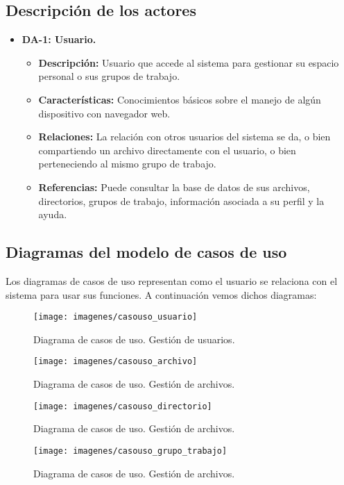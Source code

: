 \subsection{Descripción de los actores}
\begin{itemize}
	\item \textbf{DA-1: Usuario.}
	\begin{itemize}
		\item \textbf{Descripción:} Usuario que accede al sistema para gestionar su espacio personal o sus grupos de trabajo.
		\item \textbf{Características:} Conocimientos básicos sobre el manejo de algún dispositivo con navegador web.
		\item \textbf{Relaciones:} La relación con otros usuarios del sistema se da, o bien compartiendo un archivo directamente con el usuario, o bien perteneciendo al mismo grupo de trabajo.
		\item \textbf{Referencias:} Puede consultar la base de datos de sus archivos, directorios, grupos de trabajo, información asociada a su perfil y la ayuda.
	\end{itemize}
\end{itemize}
\subsection{Diagramas del modelo de casos de uso}
Los diagramas de casos de uso representan como el usuario se relaciona con el sistema para usar sus funciones. A continuación vemos dichos diagramas:

\begin{figure}[H]
	\centering
	\texttt{[image: imagenes/casouso\_usuario]}
	\caption{Diagrama de casos de uso. Gestión de usuarios.}
	\label{fig:casouso_usuario}
\end{figure}

\begin{figure}[H]
	\centering
	\texttt{[image: imagenes/casouso\_archivo]}
	\caption{Diagrama de casos de uso. Gestión de archivos.}
	\label{fig:casouso_archivo}
\end{figure}

\begin{figure}[H]
	\centering
	\texttt{[image: imagenes/casouso\_directorio]}
	\caption{Diagrama de casos de uso. Gestión de archivos.}
	\label{fig:casouso_directorio}
\end{figure}

\begin{figure}[H]
	\centering
	\texttt{[image: imagenes/casouso\_grupo\_trabajo]}
	\caption{Diagrama de casos de uso. Gestión de archivos.}
	\label{fig:casouso_grupo_trabajo}
\end{figure}

